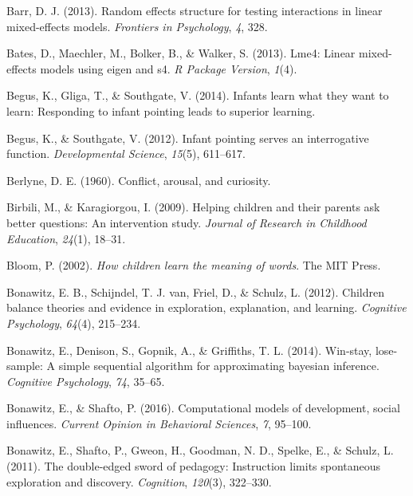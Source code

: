 \documentclass[oneside]{report}
\begin{document}
\leavevmode\hypertarget{ref-barr2013random}{}%
Barr, D. J. (2013). Random effects structure for testing interactions in
linear mixed-effects models. \emph{Frontiers in Psychology}, \emph{4},
328.

\leavevmode\hypertarget{ref-bates2013lme4}{}%
Bates, D., Maechler, M., Bolker, B., \& Walker, S. (2013). Lme4: Linear
mixed-effects models using eigen and s4. \emph{R Package Version},
\emph{1}(4).

\leavevmode\hypertarget{ref-begus2014infants}{}%
Begus, K., Gliga, T., \& Southgate, V. (2014). Infants learn what they
want to learn: Responding to infant pointing leads to superior learning.

\leavevmode\hypertarget{ref-begus2012infant}{}%
Begus, K., \& Southgate, V. (2012). Infant pointing serves an
interrogative function. \emph{Developmental Science}, \emph{15}(5),
611--617.

\leavevmode\hypertarget{ref-berlyne1960conflict}{}%
Berlyne, D. E. (1960). Conflict, arousal, and curiosity.

\leavevmode\hypertarget{ref-birbili2009helping}{}%
Birbili, M., \& Karagiorgou, I. (2009). Helping children and their
parents ask better questions: An intervention study. \emph{Journal of
Research in Childhood Education}, \emph{24}(1), 18--31.

\leavevmode\hypertarget{ref-bloom2002children}{}%
Bloom, P. (2002). \emph{How children learn the meaning of words}. The
MIT Press.

\leavevmode\hypertarget{ref-bonawitz2012children}{}%
Bonawitz, E. B., Schijndel, T. J. van, Friel, D., \& Schulz, L. (2012).
Children balance theories and evidence in exploration, explanation, and
learning. \emph{Cognitive Psychology}, \emph{64}(4), 215--234.

\leavevmode\hypertarget{ref-bonawitz2014win}{}%
Bonawitz, E., Denison, S., Gopnik, A., \& Griffiths, T. L. (2014).
Win-stay, lose-sample: A simple sequential algorithm for approximating
bayesian inference. \emph{Cognitive Psychology}, \emph{74}, 35--65.

\leavevmode\hypertarget{ref-bonawitz2016computational}{}%
Bonawitz, E., \& Shafto, P. (2016). Computational models of development,
social influences. \emph{Current Opinion in Behavioral Sciences},
\emph{7}, 95--100.

\leavevmode\hypertarget{ref-bonawitz2011double}{}%
Bonawitz, E., Shafto, P., Gweon, H., Goodman, N. D., Spelke, E., \&
Schulz, L. (2011). The double-edged sword of pedagogy: Instruction
limits spontaneous exploration and discovery. \emph{Cognition},
\emph{120}(3), 322--330.
\end{document}
